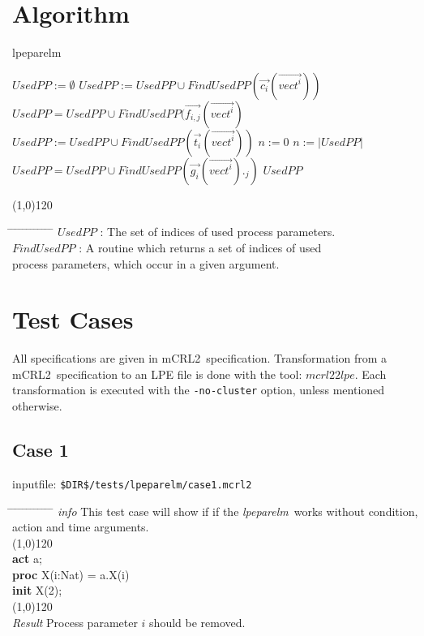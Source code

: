 \documentclass[a4paper,10pt]{article}
\theoremstyle{plain}
\theoremstyle{definition}
\newcommand{\mcrl}{mCRL2}
\newcommand{\tool}{\textit{lpeparelm}}
\newcommand{\ti}{\textit}
\newcommand{\tb}{\textbf}
\newcommand{\ovr}{\overrightarrow}
\newcommand{\pps}{process parameters}
\newcommand{\tab}{\hspace*{5.mm} \= \hspace*{5.mm} \= \hspace*{5.mm} \= \hspace*{5.mm} \= \hspace*{5.mm} \= \hspace*{5.mm}  \= \hspace*{5.mm}  \= \hspace*{5.mm}  \= \hspace*{5.mm} \= \hspace*{5.mm} \= \hspace*{5.mm}  \= \hspace*{5.mm}  \= \hspace*{5.mm}\kill}
\newcommand{\tabw}{\hspace*{15.mm} \= \hspace*{20.mm} \= \hspace*{5.mm} \= \hspace*{5.mm} \= \hspace*{5.mm} \= \hspace*{5.mm}  \= \hspace*{5.mm}  \= \hspace*{5.mm}  \= \hspace*{5.mm} \= \hspace*{5.mm} \= \hspace*{5.mm}  \= \hspace*{5.mm}  \= \hspace*{5.mm}\kill}
\begin{document}
\newpage
\section{Algorithm} \label{sec:alg}
\begin{algorithm}[h]
\caption{lpeparelm}
\begin{algorithmic}[1]
\STATE $UsedPP := \emptyset $
    \STATE $UsedPP := UsedPP \cup FindUsedPP(\ovr{c_i}(\ovr{vect^i}))$
      \STATE $UsedPP = UsedPP \cup FindUsedPP(\ovr{f_{i,j}}(\ovr{vect^i})$
    \ENDFOR
    \STATE $UsedPP := UsedPP \cup FindUsedPP(\ovr{t_i}(\ovr{vect^i}))$
  \ENDFOR
\STATE $n := 0$
\STATE $n := \vert UsedPP \vert$
      \STATE $UsedPP = UsedPP \cup FindUsedPP(\ovr{g_i}(\ovr{vect^i})._j) $
    \ENDFOR
  \ENDFOR
\ENDWHILE
\RETURN $UsedPP$
\end{algorithmic}
\line(1,0){120}
\begin{tabbing}
\tab
$UsedPP$ \> \> \> \> : \> The set of indices of used \pps .\\
$FindUsedPP$ \> \> \> \> : \> A routine which returns a set of indices of used\\
\> \> \> \> \> \pps, which occur in a given argument.
\end{tabbing}
\end{algorithm}

\newpage
\section{Test Cases}
All specifications are given in \mcrl\ specification.
Transformation from a \mcrl\ specification to an LPE file is done with the tool:
$mcrl22lpe$. Each transformation is executed with the \verb"-no-cluster" option, unless
mentioned otherwise.

\subsection*{Case 1}
inputfile: \verb"$DIR$/tests/lpeparelm/case1.mcrl2"
\begin{tabbing}
\tabw
\ti{info} \> This test case will show if if the \tool\ works without condition, action and time arguments.\\
\line(1,0){120}\\
\tb{act} \> a; \\
\tb{proc} \> X(i:Nat) = \> a.X(i)\\
\tb{init} \> X(2); \\  
\line(1,0){120}\\
\ti{Result} \> Process parameter $i$ should be removed.\\ 
\end{tabbing}
\end{document}
